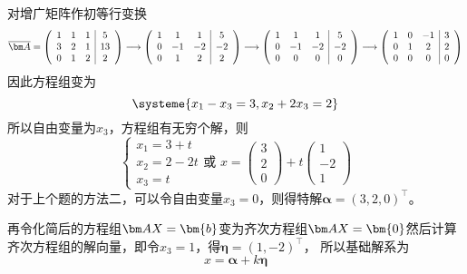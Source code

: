 \begin{solution}
    对增广矩阵作初等行变换
    \[
        \overline{\mat{A}}=
        \left(\begin{array}{ccc|c}
                1 & 1 & 1 & 5  \\
                3 & 2 & 1 & 13 \\
                0 & 1 & 2 & 2
            \end{array}\right)
        \longrightarrow
        \left(\begin{array}{ccc|c}
                1 & 1  & 1  & 5  \\
                0 & -1 & -2 & -2 \\
                0 & 1  & 2  & 2
            \end{array}\right)
        \longrightarrow
        \left(\begin{array}{ccc|c}
                1 & 1  & 1  & 5  \\
                0 & -1 & -2 & -2 \\
                0 & 0  & 0  & 0
            \end{array}\right)
        \longrightarrow
        \left(\begin{array}{ccc|c}
                1 & 0 & -1 & 3 \\
                0 & 1 & 2  & 2 \\
                0 & 0 & 0  & 0
            \end{array}\right)
    \]
    因此方程组变为
    \[
        \systeme{
            x_1 - x_3 = 3,
            x_2 + 2x_3 = 2
        }
    \]
    所以自由变量为$x_3$，方程组有无穷个解，则
    \[
        \begin{cases}
            x_1 = 3+t  \\
            x_2 = 2-2t \\
            x_3 = t
        \end{cases}
        \text{或~}
        x =
        \begin{pmatrix}
            3 \\2\\0
        \end{pmatrix}
        +t
        \begin{pmatrix}
            1 \\-2\\1
        \end{pmatrix}
    \]
    对于上个题的方法二，可以令自由变量$x_3=0$，则得特解$\bm{\alpha}=(3,2,0)^\intercal$。

    再令化简后的方程组$\mat{AX}=\bm{b}$变为齐次方程组$\mat{AX}=\bm{0}$然后计算齐次方程组的解向量，即令$x_3=1$，得$\bm{\eta}=(1,-2)^\intercal$，
    所以基础解系为
    \[ x= \bm{\alpha} + k\bm{\eta} \]
\end{solution}

